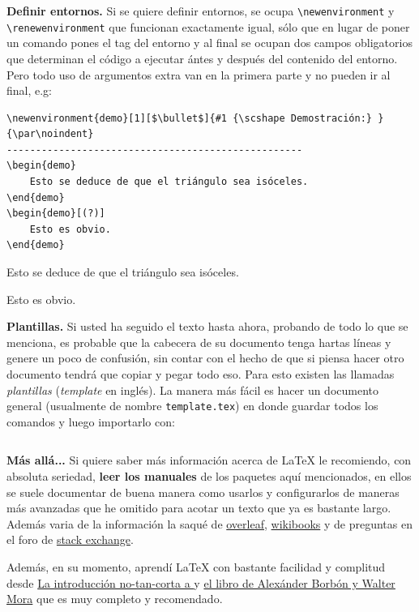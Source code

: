 \textbf{Definir entornos.} Si se quiere definir entornos, se ocupa \lstinline|\newenvironment| y \lstinline|\renewenvironment| que funcionan exactamente igual, sólo que en lugar de poner un comando pones el tag del entorno y al final se ocupan dos campos obligatorios que determinan el código a ejecutar ántes y después del contenido del entorno. Pero todo uso de argumentos extra van en la primera parte y no pueden ir al final, e.g:
\begin{lstlisting}
\newenvironment{demo}[1][$\bullet$]{#1 {\scshape Demostración:} }{\par\noindent}
---------------------------------------------------
\begin{demo}
	Esto se deduce de que el triángulo sea isóceles.
\end{demo}
\begin{demo}[(?)]
	Esto es obvio.
\end{demo}
\end{lstlisting}
\begin{demo}
	Esto se deduce de que el triángulo sea isóceles.
\end{demo}
\begin{demo}[(?)]
	Esto es obvio.
\end{demo}
\textbf{Plantillas.} Si usted ha seguido el texto hasta ahora, probando de todo lo que se menciona, es probable que la cabecera de su documento tenga hartas líneas y genere un poco de confusión, sin contar con el hecho de que si piensa hacer otro documento tendrá que copiar y pegar todo eso. Para esto existen las llamadas \textit{plantillas} (\textit{template} en inglés). La manera más fácil es hacer un documento general (usualmente de nombre \texttt{template.tex}) en donde guardar todos los comandos y luego importarlo con:
\begin{lstlisting}

\end{lstlisting}

\textbf{Más allá...} Si quiere saber más información acerca de \LaTeX{} le recomiendo, con absoluta seriedad, \textbf{leer los manuales} de los paquetes aquí mencionados, en ellos se suele documentar de buena manera como usarlos y configurarlos de maneras más avanzadas que he omitido para acotar un texto que ya es bastante largo. Además varia de la información la saqué de \href{https://www.overleaf.com/learn/latex/Main_Page}{\ttfamily\color{newgreen}overleaf}, \href{https://en.wikibooks.org/wiki/LaTeX}{\ttfamily\color{newblue}wikibooks} y de preguntas en el foro de \href{https://tex.stackexchange.com/}{\ttfamily\color{newred}stack exchange}.

Además, en su momento, aprendí \LaTeX{} con bastante facilidad y complitud desde \href{https://www.ctan.org/tex-archive/info/lshort/spanish}{La introducción no-tan-corta a \LaTeXe{}} y \href{https://www.academia.edu/35478409/Edici%C3%B3n_de_Textos_Cient%C3%ADficos_con_LaTeX_Composici%C3%B3n_Gr%C3%A1ficos_Inkscape_y_Presentaciones_Beamer}{el libro de Alexánder Borbón y Walter Mora} que es muy completo y recomendado.

